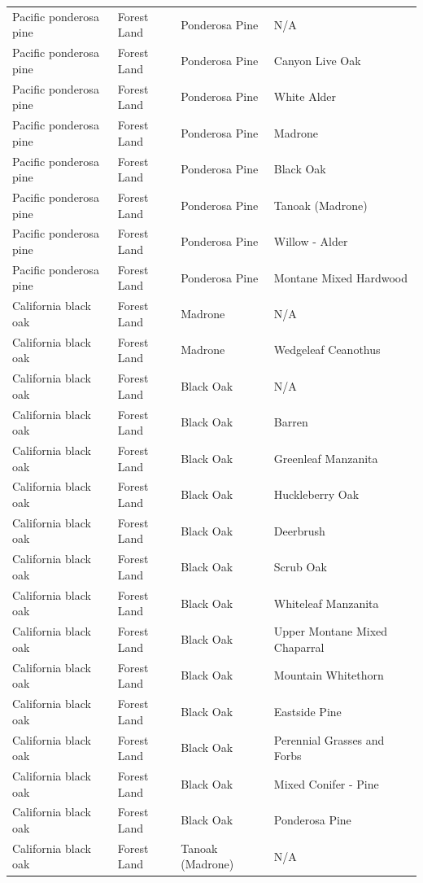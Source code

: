\documentclass{article}
\begin{document}
\begin{tabular}{llll}
Pacific ponderosa pine	&	Forest Land	&	Ponderosa Pine	&	N/A	\\
Pacific ponderosa pine	&	Forest Land	&	Ponderosa Pine	&	Canyon Live Oak	\\
Pacific ponderosa pine	&	Forest Land	&	Ponderosa Pine	&	White Alder	\\
Pacific ponderosa pine	&	Forest Land	&	Ponderosa Pine	&	Madrone	\\
Pacific ponderosa pine	&	Forest Land	&	Ponderosa Pine	&	Black Oak	\\
Pacific ponderosa pine	&	Forest Land	&	Ponderosa Pine	&	Tanoak (Madrone)	\\
Pacific ponderosa pine	&	Forest Land	&	Ponderosa Pine	&	Willow - Alder	\\
Pacific ponderosa pine	&	Forest Land	&	Ponderosa Pine	&	Montane Mixed Hardwood	\\
California black oak	&	Forest Land	&	Madrone	&	N/A	\\
California black oak	&	Forest Land	&	Madrone	&	Wedgeleaf Ceanothus	\\
California black oak	&	Forest Land	&	Black Oak	&	N/A	\\
California black oak	&	Forest Land	&	Black Oak	&	Barren	\\
California black oak	&	Forest Land	&	Black Oak	&	Greenleaf Manzanita	\\
California black oak	&	Forest Land	&	Black Oak	&	Huckleberry Oak	\\
California black oak	&	Forest Land	&	Black Oak	&	Deerbrush	\\
California black oak	&	Forest Land	&	Black Oak	&	Scrub Oak	\\
California black oak	&	Forest Land	&	Black Oak	&	Whiteleaf Manzanita	\\
California black oak	&	Forest Land	&	Black Oak	&	Upper Montane Mixed Chaparral	\\
California black oak	&	Forest Land	&	Black Oak	&	Mountain Whitethorn	\\
California black oak	&	Forest Land	&	Black Oak	&	Eastside Pine	\\
California black oak	&	Forest Land	&	Black Oak	&	Perennial Grasses and Forbs	\\
California black oak	&	Forest Land	&	Black Oak	&	Mixed Conifer - Pine	\\
California black oak	&	Forest Land	&	Black Oak	&	Ponderosa Pine	\\
California black oak	&	Forest Land	&	Tanoak (Madrone)	&	N/A	\\

\end{tabular}
\end{document}
